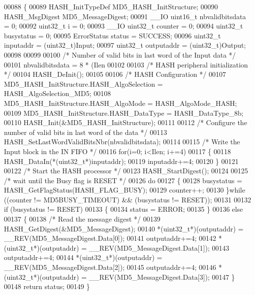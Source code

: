 \begin{DoxyCode}
00088 \{
00089   HASH_InitTypeDef MD5\_HASH\_InitStructure;
00090   HASH_MsgDigest MD5\_MessageDigest;
00091   \_\_IO uint16\_t nbvalidbitsdata = 0;
00092   uint32\_t i = 0;
00093   \_\_IO uint32\_t counter = 0;
00094   uint32\_t busystatus = 0;
00095   ErrorStatus status = SUCCESS;
00096   uint32\_t inputaddr  = (uint32\_t)Input;
00097   uint32\_t outputaddr = (uint32\_t)Output;
00098 
00099 
00100   \textcolor{comment}{/* Number of valid bits in last word of the Input data */}
00101   nbvalidbitsdata = 8 * (Ilen %
00102 
00103   \textcolor{comment}{/* HASH peripheral initialization */}
00104   HASH_DeInit();
00105 
00106   \textcolor{comment}{/* HASH Configuration */}
00107   MD5\_HASH\_InitStructure.HASH_AlgoSelection = HASH_AlgoSelection_MD5;
00108   MD5\_HASH\_InitStructure.HASH_AlgoMode = HASH_AlgoMode_HASH;
00109   MD5\_HASH\_InitStructure.HASH_DataType = HASH_DataType_8b;
00110   HASH_Init(&MD5\_HASH\_InitStructure);
00111 
00112   \textcolor{comment}{/* Configure the number of valid bits in last word of the data */}
00113   HASH_SetLastWordValidBitsNbr(nbvalidbitsdata);
00114 
00115   \textcolor{comment}{/* Write the Input block in the IN FIFO */}
00116   \textcolor{keywordflow}{for}(i=0; i<Ilen; i+=4)
00117   \{
00118     HASH_DataIn(*(uint32\_t*)inputaddr);
00119     inputaddr+=4;
00120   \}
00121 
00122   \textcolor{comment}{/* Start the HASH processor */}
00123   HASH_StartDigest();
00124 
00125   \textcolor{comment}{/* wait until the Busy flag is RESET */}
00126   \textcolor{keywordflow}{do}
00127   \{
00128     busystatus = HASH_GetFlagStatus(HASH_FLAG_BUSY);
00129     counter++;
00130   \}\textcolor{keywordflow}{while} ((counter != MD5BUSY_TIMEOUT) && (busystatus != RESET));
00131 
00132   \textcolor{keywordflow}{if} (busystatus != RESET)
00133   \{
00134      status = ERROR;
00135   \}
00136   \textcolor{keywordflow}{else}
00137   \{
00138     \textcolor{comment}{/* Read the message digest */}
00139     HASH_GetDigest(&MD5\_MessageDigest);
00140     *(uint32\_t*)(outputaddr)  = \_\_REV(MD5\_MessageDigest.Data[0]);
00141     outputaddr+=4;
00142     *(uint32\_t*)(outputaddr)  = \_\_REV(MD5\_MessageDigest.Data[1]);
00143     outputaddr+=4;
00144     *(uint32\_t*)(outputaddr)  = \_\_REV(MD5\_MessageDigest.Data[2]);
00145     outputaddr+=4;
00146     *(uint32\_t*)(outputaddr)  = \_\_REV(MD5\_MessageDigest.Data[3]);
00147   \}
00148   \textcolor{keywordflow}{return} status; 
00149 \}
\end{DoxyCode}
\mbox{\label{group__HASH__Group7_gac61733e7aa66bdd2f21be4b34165b5be}} 
